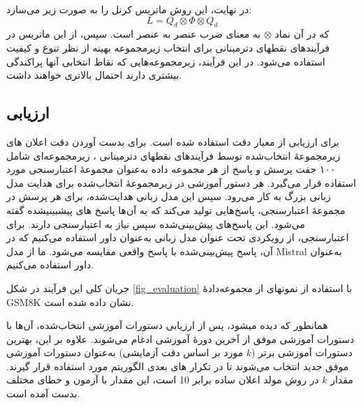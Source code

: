 \noindent در نهایت، این روش ماتریس کرنل را به صورت زیر می‌سازد:
\begin{equation}
	L = Q_{d} \otimes
	\Phi \otimes
	Q_{d}
\end{equation}
که در آن نماد \( \otimes \) به معنای ضرب عنصر به عنصر
 است.
سپس، از این ماتریس در فرآیندهای نقطه\/ای دترمینانی برای انتخاب زیرمجموعه بهینه از نظر تنوع و کیفیت استفاده می‌شود.
در این فرآیند، زیرمجموعه‌هایی که نقاط انتخابی آنها پراکندگی بیشتری دارند احتمال بالاتری خواهند داشت.




\subsection{ارزیابی}
برای ارزیابی
از معیار دقت
 استفاده شده است. برای بدست آوردن دقت اعلان های زیرمجموعهٔ انتخاب‌شده توسط فرآیندهای نقطه\/ای دترمینانی ، زیرمجموعه‌ای شامل ۱۰۰ جفت پرسش و پاسخ از هر مجموعه داده به‌عنوان مجموعهٔ اعتبارسنجی
  مورد استفاده قرار می‌گیرد. 
هر دستور آموزشی در زیرمجموعهٔ انتخاب‌شده برای هدایت مدل زبانی بزرگ به کار می‌رود. سپس این مدل زبانی هدایت‌شده، برای هر پرسش در مجموعهٔ اعتبارسنجی، پاسخ‌هایی تولید می‌کند که به آن‌ها پاسخ های پیش\/بینی\/شده گفته می‌شود.
این پاسخ‌های پیش‌بینی‌شده سپس نیاز به اعتبارسنجی دارند. برای اعتبارسنجی، از رویکردی تحت عنوان مدل زبانی به‌عنوان داور
 استفاده می‌کنیم که در آن، پاسخ پیش‌بینی‌شده با پاسخ واقعی مقایسه می‌شود. ما از مدل Mistral به‌عنوان داور استفاده می‌کنیم.

\noindent جریان کلی این فرآیند در شکل
 \ref{fig_evaluation} با استفاده از نمونه\/ای از مجموعه‌دادهٔ GSM8K  نشان داده شده است.

\noindent همانطور که دیده می\/شود، پس از ارزیابی دستورات آموزشی انتخاب‌شده، آن‌ها با دستورات آموزشی موفق از آخرین دورهٔ آموزشی ادغام می‌شوند.
علاوه بر این، بهترین دستورات آموزشی برتر (\(k\) مورد بر اساس دقت آزمایشی) به‌عنوان دستورات آموزشی موفق جدید انتخاب می‌شوند تا در تکرار های بعدی الگوریتم مورد استفاده قرار گیرند. مقدار \(k\) در روش مولد اعلان ساده برابر 10 است، این مقدار با آزمون و خطای مختلف بدست آمده است.

